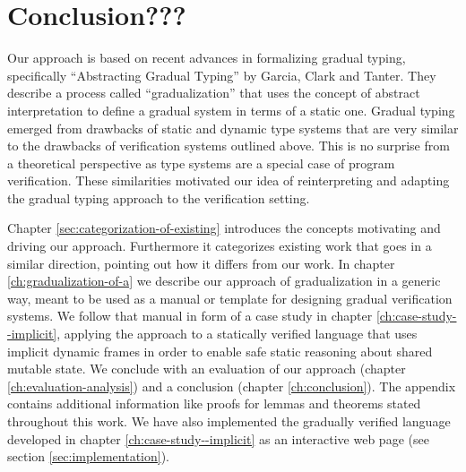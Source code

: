 
\section{Conclusion???}
Our approach is based on recent advances in formalizing gradual typing, specifically “Abstracting Gradual Typing” \cite{garcia2016abstracting} by Garcia, Clark and Tanter.
They describe a process called “gradualization” that uses the concept of abstract interpretation to define a gradual system in terms of a static one.
Gradual typing emerged from drawbacks of static and dynamic type systems that are very similar to the drawbacks of verification systems outlined above.
This is no surprise from a theoretical perspective as type systems are a special case of program verification. 
These similarities motivated our idea of reinterpreting and adapting the gradual typing approach to the verification setting.

Chapter \ref{sec:categorization-of-existing} introduces the concepts motivating and driving our approach.
Furthermore it categorizes existing work that goes in a similar direction, pointing out how it differs from our work.
In chapter \ref{ch:gradualization-of-a} we describe our approach of gradualization in a generic way, meant to be used as a manual or template for designing gradual verification systems.
We follow that manual in form of a case study in chapter \ref{ch:case-study--implicit}, applying the approach to a statically verified language that uses implicit dynamic frames in order to enable safe static reasoning about shared mutable state.
We conclude with an evaluation of our approach (chapter \ref{ch:evaluation-analysis}) and a conclusion (chapter \ref{ch:conclusion}).
The appendix contains additional information like proofs for lemmas and theorems stated throughout this work. %
We have also implemented the gradually verified language developed in chapter \ref{ch:case-study--implicit} as an interactive web page (see section \ref{sec:implementation}).
